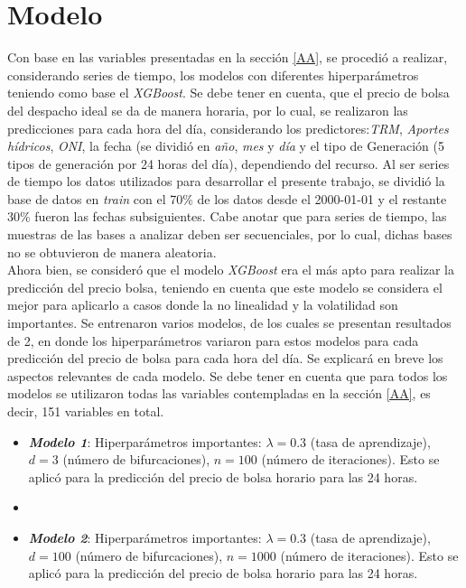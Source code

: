 \documentclass[conference, 10pt]{IEEEtran}
\begin{document}
\section{Modelo} \label{BB}

Con base en las variables presentadas en la sección \ref{AA}, se procedió a realizar, considerando series de tiempo, los modelos con diferentes hiperparámetros teniendo como base el \textit{XGBoost}. Se debe tener en cuenta, que el precio de bolsa del despacho ideal se da de manera horaria, por lo cual, se realizaron las predicciones para cada hora del día, considerando los predictores:\textit{TRM}, \textit{Aportes hídricos}, \textit{ONI}, la fecha (se dividió en \textit{año}, \textit{mes} y \textit{día} y el tipo de Generación (5 tipos de generación por 24 horas del día), dependiendo del recurso. Al ser series de tiempo los datos utilizados para desarrollar el presente trabajo, se dividió la base de datos en \textit{train} con el 70\% de los datos desde el 2000-01-01 y el restante 30\% fueron las fechas subsiguientes. Cabe anotar que para series de tiempo, las muestras de las bases a analizar deben ser secuenciales, por lo cual, dichas bases no se obtuvieron de manera aleatoria.\\
Ahora bien, se consideró que el modelo \textit{XGBoost} era el más apto para realizar la predicción del precio bolsa, teniendo en cuenta que este modelo se considera el mejor para aplicarlo a casos donde la no linealidad y la volatilidad son importantes. Se entrenaron varios modelos, de los cuales se presentan resultados de 2, en donde los hiperparámetros variaron para estos modelos para cada predicción del precio de bolsa para cada hora del día. Se explicará en breve los aspectos relevantes de cada modelo. Se debe tener en cuenta que para todos los modelos se utilizaron todas las variables contempladas en la sección \ref{AA}, es decir, 151 variables en total.

\begin{itemize}
\item \textit{\textbf{Modelo 1}}: Hiperparámetros importantes: $\lambda=0.3$ (tasa de aprendizaje), $d=3$ (número de bifurcaciones), $n=100$ (número de iteraciones). Esto se aplicó para la predicción del precio de bolsa horario para las 24 horas.
\item \item \textit{\textbf{Modelo 2}}: Hiperparámetros importantes: $\lambda=0.3$ (tasa de aprendizaje), $d=100$ (número de bifurcaciones), $n=1000$ (número de iteraciones). Esto se aplicó para la predicción del precio de bolsa horario para las 24 horas.
\end{itemize}
\end{document}
